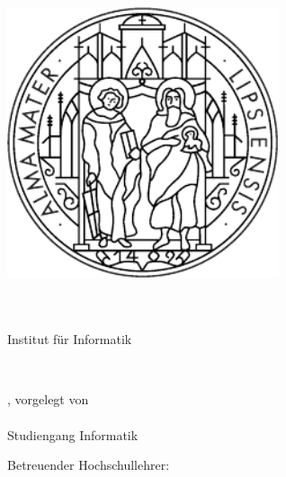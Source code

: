\begin{titlepage}
    \begin{addmargin}[-1cm]{-3cm}
    \begin{center}
        \large

        \hfill


        \includegraphics[width=8cm]{gfx/uni_leipzig_logo} \\ \medskip

        \myUni \\
        \myFaculty \\
        Institut für Informatik \\ \medskip

        \begingroup
            \color{CTtitle}\spacedallcaps{\myTitle} \\ \bigskip
        \endgroup

        \spacedlowsmallcaps{\mySubtitle}

        \vfill

        \myLocation, \myTime%
        \hfill 
        vorgelegt von\\\hfill
        \myName\\\hfill
        Studiengang Informatik
        
        \vfill
        Betreuender Hochschullehrer:\\\smallskip
        \myProf \\




    \end{center}
  \end{addmargin}
\end{titlepage}
